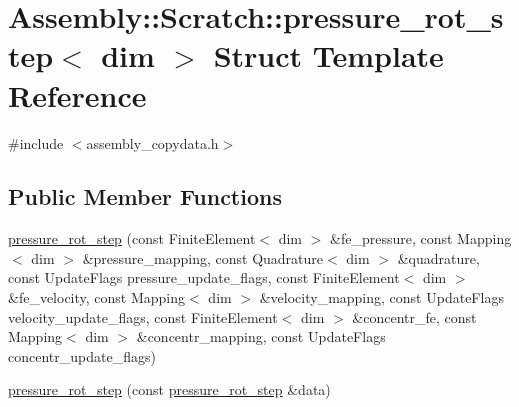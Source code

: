 \hypertarget{struct_assembly_1_1_scratch_1_1pressure__rot__step}{}\section{Assembly\+:\+:Scratch\+:\+:pressure\+\_\+rot\+\_\+step$<$ dim $>$ Struct Template Reference}
\label{struct_assembly_1_1_scratch_1_1pressure__rot__step}


{\ttfamily \#include $<$assembly\+\_\+copydata.\+h$>$}

\subsection*{Public Member Functions}
\begin{DoxyCompactItemize}
\item 
\hyperlink{struct_assembly_1_1_scratch_1_1pressure__rot__step_a9a782a85d4cfb0b5f50a0fcd76924d23}{pressure\+\_\+rot\+\_\+step} (const Finite\+Element$<$ dim $>$ \&fe\+\_\+pressure, const Mapping$<$ dim $>$ \&pressure\+\_\+mapping, const Quadrature$<$ dim $>$ \&quadrature, const Update\+Flags pressure\+\_\+update\+\_\+flags, const Finite\+Element$<$ dim $>$ \&fe\+\_\+velocity, const Mapping$<$ dim $>$ \&velocity\+\_\+mapping, const Update\+Flags velocity\+\_\+update\+\_\+flags, const Finite\+Element$<$ dim $>$ \&concentr\+\_\+fe, const Mapping$<$ dim $>$ \&concentr\+\_\+mapping, const Update\+Flags concentr\+\_\+update\+\_\+flags)
\item 
\hyperlink{struct_assembly_1_1_scratch_1_1pressure__rot__step_ad8ce0533193a2013774b98c0e7b81581}{pressure\+\_\+rot\+\_\+step} (const \hyperlink{struct_assembly_1_1_scratch_1_1pressure__rot__step}{pressure\+\_\+rot\+\_\+step} \&data)
\end{DoxyCompactItemize}
